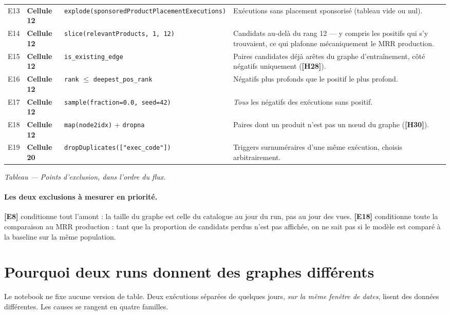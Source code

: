 \documentclass[11pt,a4paper]{article}
\newcommand{\code}[1]{\texttt{\small #1}}
\newcommand{\hyp}[1]{\textcolor{hypcol}{\textbf{\small [#1]}}}
\newcommand{\cell}[1]{\textbf{Cellule #1}}
\begin{document}
{\begin{longtable}{@{}l p{3.2cm} p{4.4cm} p{5.2cm}@{}}
E13 & \cell{12} & \code{explode(sponsoredProductPlacementExecutions)} & Exécutions sans placement sponsorisé (tableau vide ou nul). \\
E14 & \cell{12} & \code{slice(relevantProducts, 1, 12)} & Candidats au-delà du rang 12 --- y compris les positifs qui s'y trouvaient, ce qui plafonne mécaniquement le MRR production. \\
E15 & \cell{12} & \code{is\_existing\_edge} & Paires candidates déjà arêtes du graphe d'entraînement, côté négatifs uniquement (\hyp{H28}). \\
E16 & \cell{12} & \code{rank} $\le$ \code{deepest\_pos\_rank} & Négatifs plus profonds que le positif le plus profond. \\
E17 & \cell{12} & \code{sample(fraction=0.0, seed=42)} & \emph{Tous} les négatifs des exécutions sans positif. \\
E18 & \cell{12} & \code{map(node2idx)} + \code{dropna} & Paires dont un produit n'est pas un nœud du graphe (\hyp{H30}). \\
E19 & \cell{20} & \code{dropDuplicates(["exec\_code"])} & Triggers surnuméraires d'une même exécution, choisis arbitrairement. \\

\end{longtable}
}
\label{tab:exclusions}
\begin{center}\footnotesize\itshape Tableau \thetable{} --- Points d'exclusion, dans l'ordre du flux.\end{center}

\paragraph{Les deux exclusions à mesurer en priorité.}
\hyp{E8} conditionne tout l'amont : la taille du graphe est celle du catalogue au
jour du run, pas au jour des vues. \hyp{E18} conditionne toute la comparaison au
MRR production : tant que la proportion de candidats perdus n'est pas affichée, on
ne sait pas si le modèle est comparé à la baseline sur la même population.

\clearpage
\section{Pourquoi deux runs donnent des graphes différents}
\label{sec:variabilite}

Le notebook ne fixe aucune version de table. Deux exécutions séparées de quelques
jours, \emph{sur la même fenêtre de dates}, lisent des données différentes. Les
causes se rangent en quatre familles.
\end{document}
